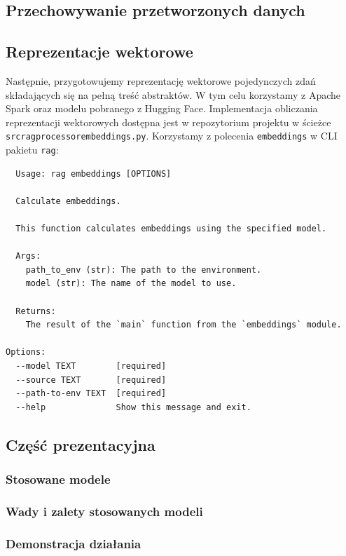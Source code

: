 \documentclass[10pt]{article}
\begin{document}
\subsection{Przechowywanie przetworzonych danych}

\subsection{Reprezentacje wektorowe}

Następnie, przygotowujemy reprezentację wektorowe pojedynczych zdań składających się na pełną treść abstraktów. W tym celu korzystamy z Apache Spark oraz modelu pobranego z Hugging Face. Implementacja obliczania reprezentacji wektorowych dostępna jest w repozytorium projektu w ścieżce \texttt{src\/rag\/processor\/embeddings.py}. Korzystamy z polecenia \texttt{embeddings} w CLI pakietu \texttt{rag}:

\begin{lstlisting}
  Usage: rag embeddings [OPTIONS]

  Calculate embeddings.

  This function calculates embeddings using the specified model.

  Args:
    path_to_env (str): The path to the environment.
    model (str): The name of the model to use.

  Returns: 
    The result of the `main` function from the `embeddings` module.

Options:
  --model TEXT        [required]
  --source TEXT       [required]
  --path-to-env TEXT  [required]
  --help              Show this message and exit.
\end{lstlisting}

\subsection{Część prezentacyjna}

\subsubsection{Stosowane modele}

\subsubsection{Wady i zalety stosowanych modeli}

\subsubsection{Demonstracja działania}
\end{document}
